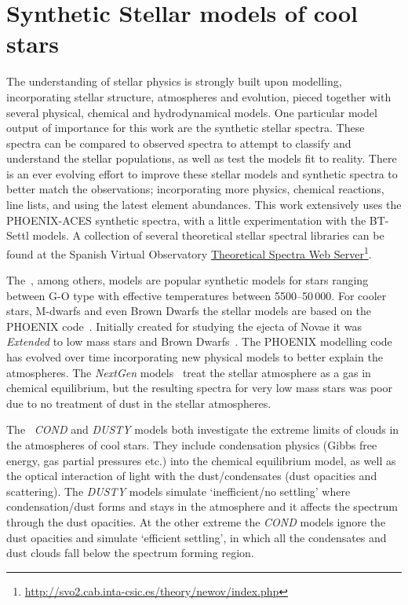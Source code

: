 

\section{Synthetic Stellar models of cool stars}
The understanding of stellar physics is strongly built upon modelling, incorporating stellar structure, atmospheres and evolution, pieced together with several physical, chemical and hydrodynamical models.
One particular model output of importance for this work are the synthetic stellar spectra.
These spectra can be compared to observed spectra to attempt to classify and understand the stellar populations, as well as test the models fit to reality.
There is an ever evolving effort to improve these stellar models and synthetic spectra to better match the observations; incorporating more physics, chemical reactions, line lists, and using the latest element abundances.
This work extensively uses the {PHOENIX-ACES} synthetic spectra, with a little experimentation with the {BT-Settl} models.
A collection of several theoretical stellar spectral libraries can be found at the Spanish Virtual Observatory \href{http://svo2.cab.inta-csic.es/theory/newov/index.php}{Theoretical Spectra Web Server}\footnote{\href{http://svo2.cab.inta-csic.es/theory/newov/index.php}{http://svo2.cab.inta-csic.es/theory/newov/index.php}}.

The~\citet{kurucz_model_1979}, among others, models are popular synthetic models for stars ranging between G-O type with effective temperatures between 5500--50\,000\K{}.
For cooler stars, M-dwarfs and even Brown Dwarfs the stellar models are based on the {PHOENIX} code~\citep[e.g.][]{hauschildt_parallel_1997}.
Initially created for studying the ejecta of Novae it was \emph{Extended} to low mass stars and Brown Dwarfs~\citep{allard_model_1995}.
The {PHOENIX} modelling code has evolved over time incorporating new physical models to better explain the atmospheres.
The \emph{NextGen} models~\citep{hauschildt_nextgen_1999} treat the stellar atmosphere as a gas in chemical equilibrium, but the resulting spectra for very low mass stars was poor due to no treatment of dust in the stellar atmospheres.

The~\citet{allard_limiting_2001} \emph{COND} and \emph{DUSTY} models both investigate the extreme limits of clouds in the atmospheres of cool stars.
They include condensation physics (Gibbs free energy, gas partial pressures etc.) into the chemical equilibrium model, as well as the optical interaction of light with the dust/condensates (dust opacities and scattering).
The \emph{DUSTY} models simulate `inefficient/no settling' where condensation/dust forms and stays in the atmosphere and it affects the spectrum through the dust opacities.
At the other extreme the \emph{COND} models ignore the dust opacities and simulate `efficient settling', in which all the condensates and dust clouds fall below the spectrum forming region.

